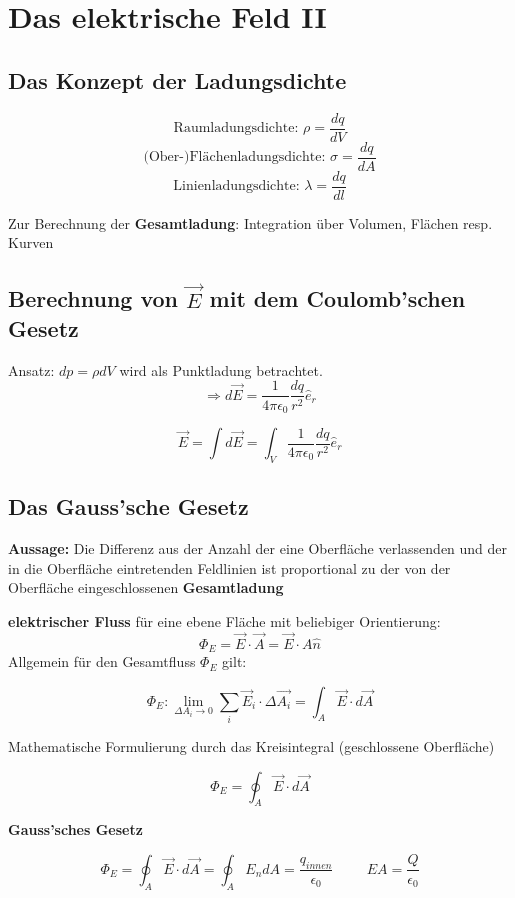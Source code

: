 \section{Das elektrische Feld II}
\subsection{Das Konzept der Ladungsdichte}
\[
    \text{Raumladungsdichte: } \rho = \frac{dq}{dV}
\]\[
    \text{(Ober-)Flächenladungsdichte: } \sigma = \frac{dq}{dA}
\]\[
    \text{Linienladungsdichte: } \lambda = \frac{dq}{dl}
\]

Zur Berechnung der \textbf{Gesamtladung}: Integration über Volumen, Flächen resp. Kurven

\subsection{Berechnung von \texorpdfstring{$\Vec{E}$}{E}  mit dem Coulomb'schen Gesetz}

Ansatz: $dp = \rho dV$ wird als Punktladung betrachtet.
\[
\Rightarrow d\Vec{E} = \frac{1}{4\pi\epsilon_0}\frac{dq}{r^2}\hat{e}_r
\]
\begin{formulabox}
\[
    \Vec{E} = \int d\Vec{E} = \int_V \frac{1}{4\pi\epsilon_0}\frac{dq}{r^2}\hat{e}_r
\]
\end{formulabox}
\subsection{Das Gauss'sche Gesetz}

\textbf{Aussage:} Die Differenz aus der Anzahl der eine Oberfläche verlassenden und der in die Oberfläche eintretenden Feldlinien ist proportional zu der von der Oberfläche eingeschlossenen \textbf{Gesamtladung}


\textbf{elektrischer Fluss} für eine ebene Fläche mit beliebiger Orientierung:
\[
    \Phi_E = \Vec{E}\cdot\Vec{A} = \Vec{E}\cdot A\hat{n}
\]
Allgemein für den Gesamtfluss $\Phi_E$ gilt:
\begin{formulabox}
\[
    \Phi_E: \lim_{ \Delta A_i \to 0} \sum_i \Vec{E}_i \cdot \Delta \Vec{A_i}  = \int_A \Vec{E} \cdot d\Vec{A} 
\]
\end{formulabox}
Mathematische Formulierung durch das Kreisintegral (geschlossene Oberfläche)
\begin{formulabox}
\[
    \Phi_E = \oint_A \Vec{E} \cdot d\Vec{A}
\]
\end{formulabox}
\textbf{Gauss'sches Gesetz}
\begin{formulabox}
\[
    \Phi_E = \oint_A \Vec{E} \cdot d\Vec{A} = \oint_A E_n dA = \frac{q_{innen}}{\epsilon_0} \hspace{1cm}  EA = \frac{Q}{\epsilon_0}
\]
\end{formulabox}


